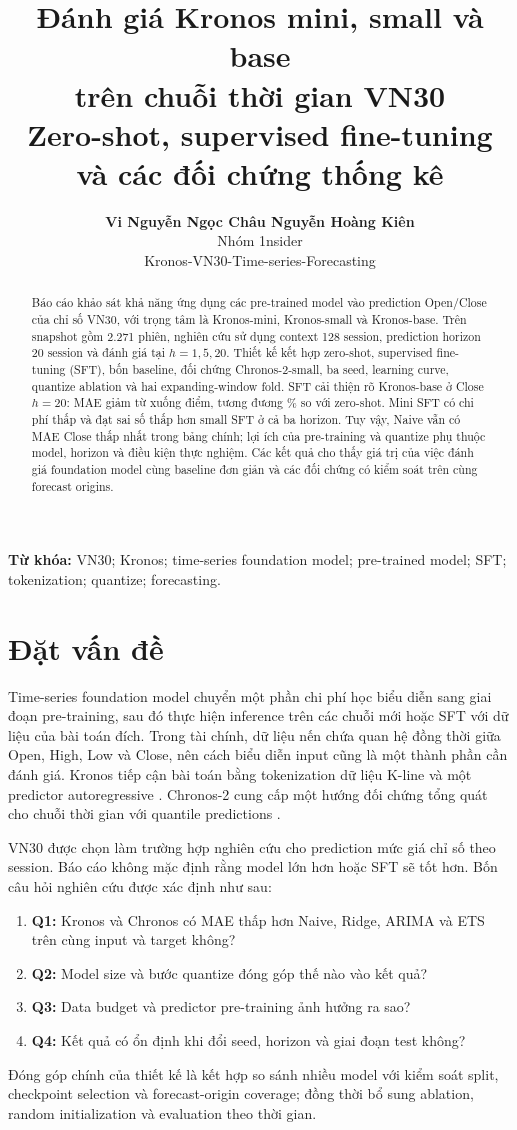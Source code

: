 \documentclass[11pt,a4paper]{article}
\title{\vspace{-1.3cm}\textbf{Đánh giá Kronos mini, small và base\\trên chuỗi thời gian VN30}\\[6pt]
 \large Zero-shot, supervised fine-tuning và các đối chứng thống kê}
\author{\textbf{Vi Nguyễn Ngọc Châu \quad Nguyễn Hoàng Kiên}\\[3pt]
 \normalsize Nhóm 1nsider\\
 \small Kronos-VN30-Time-series-Forecasting}
\date{}
\begin{document}
\maketitle
\thispagestyle{empty}
\begin{abstract}
Báo cáo khảo sát khả năng ứng dụng các pre-trained model vào prediction
Open/Close của chỉ số VN30, với trọng tâm là Kronos-mini, Kronos-small
và Kronos-base. Trên snapshot gồm 2.271 phiên, nghiên cứu sử dụng context
128 session, prediction horizon 20 session và đánh giá tại $h=1,5,20$.
Thiết kế kết hợp zero-shot, supervised fine-tuning (SFT), bốn baseline,
đối chứng Chronos-2-small, ba seed, learning curve, quantize ablation và
hai expanding-window fold. SFT cải thiện rõ Kronos-base ở Close $h=20$:
MAE giảm từ \BaseZero{} xuống \BaseSFT{} điểm, tương đương
\BaseGainPct\% so với zero-shot. Mini SFT có chi phí thấp và đạt sai số
thấp hơn small SFT ở cả ba horizon. Tuy vậy, Naive vẫn có MAE Close thấp
nhất trong bảng chính; lợi ích của pre-training và quantize phụ thuộc
model, horizon và điều kiện thực nghiệm. Các kết quả cho thấy giá trị
của việc đánh giá foundation model cùng baseline đơn giản và các đối
chứng có kiểm soát trên cùng forecast origins.
\end{abstract}
\noindent\textbf{Từ khóa:} VN30; Kronos; time-series foundation model;
pre-trained model; SFT; tokenization; quantize; forecasting.

\section{Đặt vấn đề}
Time-series foundation model chuyển một phần chi phí học biểu diễn sang
giai đoạn pre-training, sau đó thực hiện inference trên các chuỗi mới
hoặc SFT với dữ liệu của bài toán đích. Trong tài chính, dữ liệu nến chứa
quan hệ đồng thời giữa Open, High, Low và Close, nên cách biểu diễn input
cũng là một thành phần cần đánh giá. Kronos tiếp cận bài toán bằng
tokenization dữ liệu K-line và một predictor autoregressive
\citep{shi2025kronos}. Chronos-2 cung cấp một hướng đối chứng tổng quát
cho chuỗi thời gian với quantile predictions \citep{ansari2025chronos2}.

VN30 được chọn làm trường hợp nghiên cứu cho prediction mức giá chỉ số
theo session. Báo cáo không mặc định rằng model lớn hơn hoặc SFT sẽ tốt
hơn. Bốn câu hỏi nghiên cứu được xác định như sau:
\begin{enumerate}
 \item \textbf{Q1:} Kronos và Chronos có MAE thấp hơn Naive, Ridge,
 ARIMA và ETS trên cùng input và target không?
 \item \textbf{Q2:} Model size và bước quantize đóng góp thế nào vào kết quả?
 \item \textbf{Q3:} Data budget và predictor pre-training ảnh hưởng ra sao?
 \item \textbf{Q4:} Kết quả có ổn định khi đổi seed, horizon và giai đoạn test không?
\end{enumerate}
Đóng góp chính của thiết kế là kết hợp so sánh nhiều model với kiểm soát
split, checkpoint selection và forecast-origin coverage; đồng thời bổ
sung ablation, random initialization và evaluation theo thời gian.
\end{document}
